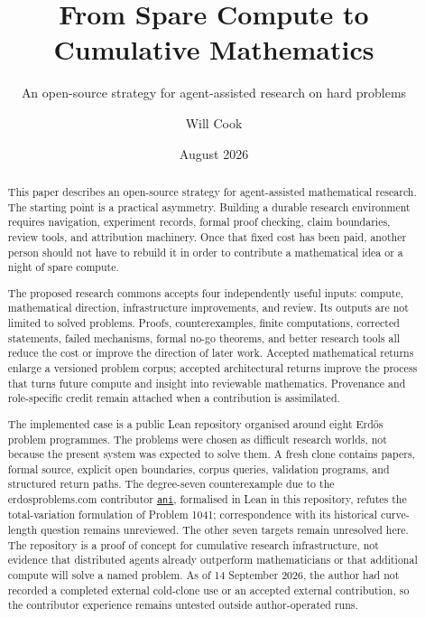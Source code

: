 \documentclass[10pt]{article}
\title{From Spare Compute to Cumulative Mathematics}
\subtitle{An open-source strategy for agent-assisted research on hard problems}
\author{Will Cook}
\date{August 2026}
\begin{document}
\maketitle
{}
\fontsize{9.2pt}{11pt}\selectfont

\begin{abstract}
This paper describes an open-source strategy for agent-assisted mathematical
research.  The starting point is a practical asymmetry.  Building a durable
research environment requires navigation, experiment records, formal proof
checking, claim boundaries, review tools, and attribution machinery.  Once
that fixed cost has been paid, another person should not have to rebuild it in
order to contribute a mathematical idea or a night of spare compute.

The proposed research commons accepts four independently useful inputs:
compute, mathematical direction, infrastructure improvements, and review.
Its outputs are not limited to solved problems.  Proofs, counterexamples,
finite computations, corrected statements, failed mechanisms, formal no-go
theorems, and better research tools all reduce the cost or improve the
direction of later work.  Accepted mathematical returns enlarge a versioned
problem corpus; accepted architectural returns improve the process that
turns future compute and insight into reviewable mathematics.  Provenance and
role-specific credit remain attached when a contribution is assimilated.

The implemented case is a public Lean repository organised around eight
Erd\H{o}s problem programmes.  The problems were chosen as difficult research worlds,
not because the present system was expected to solve them.  A fresh clone
contains papers, formal source, explicit open boundaries, corpus queries,
validation programs, and structured return paths. The degree-seven
counterexample due to the erdosproblems.com contributor
\href{https://www.erdosproblems.com/forum/thread/1041\#post-8861}{\texttt{ani}},
formalised in Lean in this repository, refutes the total-variation formulation
of Problem 1041; correspondence with its historical curve-length question
remains unreviewed. The other seven
targets remain unresolved here. The repository is a proof of concept for cumulative research
infrastructure, not evidence that distributed agents already outperform
mathematicians or that additional compute will solve a named problem. As of
14 September 2026, the author had not recorded a completed external cold-clone use
or an accepted external contribution, so the contributor experience remains
untested outside author-operated runs.


\end{abstract}
\end{document}
